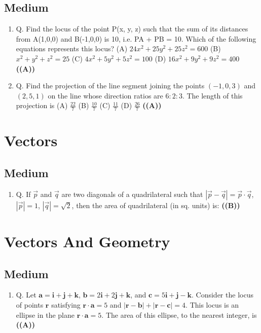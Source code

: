 \documentclass{article}
\begin{document}
\subsection{Medium}
\begin{enumerate}
\item Q. Find the locus of the point P(x, y, z) such that the sum of its distances from A(1,0,0) and B(-1,0,0) is 10, i.e. PA + PB = 10. Which of the following equations represents this locus?
(A) $24x^2 + 25y^2 + 25z^2 = 600$
(B) $x^2 + y^2 + z^2 = 25$
(C) $4x^2 + 5y^2 + 5z^2 = 100$
(D) $16x^2 + 9y^2 + 9z^2 = 400$ \hfill \textbf{((A))}
\item Q. Find the projection of the line segment joining the points $(-1,0,3)$ and $(2,5,1)$ on the line whose direction ratios are $6:2:3$. The length of this projection is
(A) $\frac{22}{7}$
(B) $\frac{10}{7}$
(C) $\frac{11}{7}$
(D) $\frac{26}{7}$ \hfill \textbf{((A))}
\end{enumerate}
\section{Vectors}
\subsection{Medium}
\begin{enumerate}
\item Q. If $\vec{p}$ and $\vec{q}$ are two diagonals of a quadrilateral such that $|\vec{p} - \vec{q}| = \vec{p} \cdot \vec{q}$, $|\vec{p}| = 1$, $|\vec{q}| = \sqrt{2}$, then the area of quadrilateral (in sq. units) is: \hfill \textbf{((B))}
\end{enumerate}
\section{Vectors And Geometry}
\subsection{Medium}
\begin{enumerate}
\item Q. Let $\mathbf{a} = \mathbf{i} + \mathbf{j} + \mathbf{k}$, $\mathbf{b} = 2\mathbf{i} + 2\mathbf{j} + \mathbf{k}$, and $\mathbf{c} = 5\mathbf{i} + \mathbf{j} - \mathbf{k}$. Consider the locus of points $\mathbf{r}$ satisfying
$\mathbf{r} \cdot \mathbf{a} = 5$ and $|\mathbf{r} - \mathbf{b}| + |\mathbf{r} - \mathbf{c}| = 4$.
This locus is an ellipse in the plane $\mathbf{r} \cdot \mathbf{a} = 5$. The area of this ellipse, to the nearest integer, is \hfill \textbf{((A))}
\end{enumerate}
\end{document}
